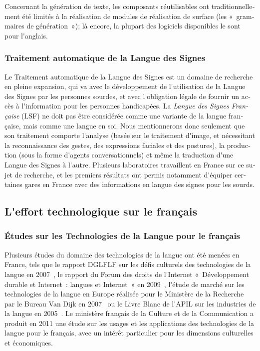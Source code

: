 \begin{french}
\begin{multicols}{2}
Concernant la génération de texte, les composants réutilisables ont
traditionnellement été limités à la réalisation de modules de
réalisation de surface (les «~grammaires de génération~»); là encore,
la plupart des logiciels disponibles le sont pour l{\mbox '}anglais.

\subsubsection{Traitement automatique de la Langue des Signes}

Le Traitement automatique de la Langue des Signes est un domaine de
recherche en pleine expansion, qui va avec le développement de
l{\mbox '}utilisation de la Langue des Signes par les personnes sourdes, et
avec l{\mbox '}obligation légale de fournir un accès à l{\mbox '}information pour les
personnes handicapées. La {\em Langue des Signes Française} (LSF) ne
doit pas être considérée comme une variante de la langue française,
mais comme une langue en soi. Nous mentionnerons donc seulement que
son traitement comporte l{\mbox '}analyse (basée sur le traitement d{\mbox '}image, et
nécessitant la reconnaissance des gestes, des expressions faciales et
des postures), la production (sous la forme d{\mbox '}agents conversationnels)
et même la traduction d{\mbox '}une Langue des Signes à l{\mbox '}autre. Plusieurs
laboratoires travaillent en France sur ce sujet de recherche, et les
premiers résultats ont permis notamment d{\mbox '}équiper certaines gares en France avec
des informations en langue des signes pour les sourds.

\subsection{L{\mbox '}effort technologique sur le français}

\subsubsection{Études sur les Technologies de la Langue pour le français}

Plusieurs études du domaine des technologies de la langue ont été
menées en France, tels que le rapport DGLFLF sur les défis culturels
des technologies de la langue en 2007~\cite{dglflf07}, le rapport du
Forum des droits de l{\mbox '}Internet «~Développement durable et
  Internet~: langues et Internet~» en 2009~\cite{droitsinternet07},
l{\mbox '}étude de marché sur les technologies de la langue en Europe
réalisée pour le Ministère de la Recherche par le Bureau Van Dijk en
2007~\cite{vandijk07} ou le Livre Blanc de l{\mbox '}APIL sur les
industries de la langue en 2005~\cite{apil05}. Le ministère français
de la Culture et de la Communication a produit en 2011 une étude sur
les usages et les applications des technologies de la langue pour le
français, avec un intérêt particulier pour les dimensions culturelles
et économiques.


\end{multicols}
\end{french}
